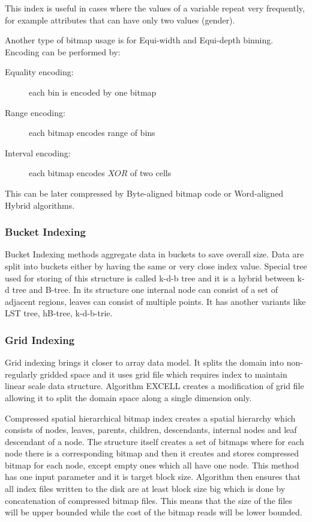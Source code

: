 This index is useful in cases where the values of a variable repeat very frequently, for example attributes that can have only two values (gender).

Another type of bitmap usage is for Equi-width and Equi-depth binning. Encoding can be performed by:

\begin{description}
\item[Equality encoding:] each bin is encoded by one bitmap
\item[Range encoding: ] each bitmap encodes range of bins
\item[Interval encoding: ] each bitmap encodes $XOR$ of two cells
\end{description}

This can be later compressed by Byte-aligned bitmap code or Word-aligned Hybrid algorithms. 
\subsubsection{Bucket Indexing}
Bucket Indexing methods aggregate data in buckets to save overall size. Data are split into buckets either by having the same or very close index value. Special tree used for storing of this structure is called k-d-b tree and it is a hybrid between k-d tree and B-tree. In its structure one internal node can consist of a set of adjacent regions, leaves can consist of multiple points. It has another variants like LST tree, hB-tree, k-d-b-trie.

\subsubsection{Grid Indexing}
Grid indexing brings it closer to array data model. It splits the domain into non-regularly gridded space and it uses grid file which requires index to maintain linear scale data structure. Algorithm EXCELL creates a modification of grid file allowing it to split the domain space along a single dimension only.

Compressed spatial hierarchical bitmap index \cite{cSHB} creates a spatial hierarchy which consists of nodes, leaves, parents, children, descendants, internal nodes and leaf descendant of a node. The structure itself creates a set of bitmaps where for each node there is a corresponding bitmap and then it creates and stores compressed bitmap for each node, except empty ones which all have one node. This method has one input parameter and it is target block size. Algorithm then ensures that all index files written to the disk are at least block size big which is done by concatenation of compressed bitmap files. This means that the size of the files will be upper bounded while the cost of the bitmap reads will be lower bounded.

